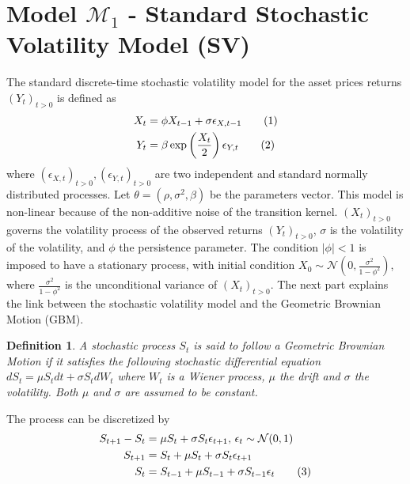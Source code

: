 \documentclass[11pt,a4,twosided,singlespacing,titlepagenumber=on]{scrreprt}
\numberwithin{equation}{chapter} %
\newtheorem{definition}[theorem]{Definition}%
\theoremstyle{remark}
\newcommand\numberthis{\addtocounter{equation}{1}\tag{\theequation}}
\begin{document}
\section{Model $\mathcal{M}_1$ - Standard Stochastic Volatility Model (SV)}
The standard discrete-time stochastic volatility model for the asset prices returns $(Y_t)_{t>0}$ is defined as
\begin{align*}
  X_t &=  \phi X_{t-1} + \sigma \epsilon_{X,t-1} \numberthis \label{std_SV_process_X} \\
  Y_t &=  \beta \exp \left( \frac{X_t}{2} \right) \epsilon_{Y,t} \numberthis
\end{align*}
where $(\epsilon_{X,t})_{t>0},(\epsilon_{Y,t})_{t>0}$ are two independent and standard normally distributed processes. Let $\theta = (\rho, \sigma^2, \beta)$ be the parameters vector. This model is non-linear because of the non-additive noise of the transition kernel. $(X_t)_{t>0}$ governs the volatility process of the observed returns $(Y_t)_{t>0}$, $\sigma$ is the volatility of the volatility, and $\phi$ the persistence parameter. The condition $|\phi| < 1$  is imposed to have a stationary process, with initial condition $X_0 \sim \mathcal{N} \left(0, \frac{\sigma^2}{1-\phi^2} \right)$, where $\frac{\sigma^2}{1-\phi^2}$ is the unconditional variance of $(X_t)_{t>0}$. The next part explains the link between the stochastic volatility model and the Geometric Brownian Motion (GBM).

\begin{definition}
\textit{
A stochastic process $S_t$ is said to follow a Geometric Brownian Motion if it satisfies the following stochastic differential equation
$dS_t = \mu S_t dt + \sigma S_t dW_t$
where $W_t$ is a Wiener process, $\mu$ the drift and $\sigma$ the volatility. Both $\mu$ and $\sigma$ are assumed to be constant.}
\end{definition}

The process can be discretized by
\begin{align*}
S_{t+1}-S_t &= \mu S_t + \sigma S_t \epsilon_{t+1} \text{, } \epsilon_{t} \sim \mathcal{N}(0,1) \\
S_{t+1} 	&= S_t + \mu S_t + \sigma S_t \epsilon_{t+1} \\
S_t 	&= S_{t-1} + \mu S_{t-1} + \sigma S_{t-1} \epsilon_t \numberthis
\end{align*}
\end{document}
